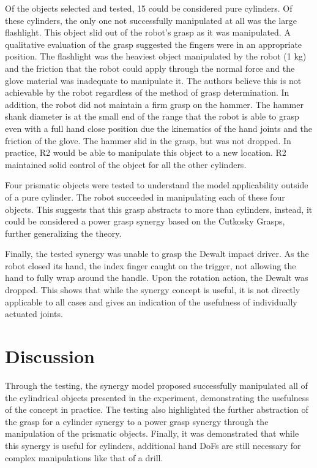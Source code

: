 \documentclass[runningheads,a4paper]{llncs}
\begin{document}
Of the objects selected and tested, 15 could be considered pure cylinders. Of these cylinders, the only one not successfully manipulated at all was the large flashlight. This object slid out of the robot's grasp as it was manipulated. A qualitative evaluation of the grasp suggested the fingers were in an appropriate position. The flashlight was the heaviest object manipulated by the robot (1 kg) and the friction that the robot could apply through the normal force and the glove material was inadequate to manipulate it. The authors believe this is not achievable by the robot regardless of the method of grasp determination. In addition, the robot did not maintain a firm grasp on the hammer. The hammer shank diameter is at the small end of the range that the robot is able to grasp even with a full hand close position due the kinematics of the hand joints and the friction of the glove. The hammer slid in the grasp, but was not dropped. In practice, R2 would be able to manipulate this object to a new location. R2 maintained solid control of the object for all the other cylinders. 

Four prismatic objects were tested to understand the model applicability outside of a pure cylinder. The robot succeeded in manipulating each of these four objects. This suggests that this grasp abstracts to more than cylinders, instead, it could be considered a power grasp synergy based on the Cutkosky Grasps, further generalizing the theory. 

Finally, the tested synergy was unable to grasp the Dewalt impact driver. As the robot closed its hand, the index finger caught on the trigger, not allowing the hand to fully wrap around the handle. Upon the rotation action, the Dewalt was dropped. This shows that while the synergy concept is useful, it is not directly applicable to all cases and gives an indication of the usefulness of individually actuated joints. 

\section{Discussion}
\label{discussion}

Through the testing, the synergy model proposed successfully manipulated all of the cylindrical objects presented in the experiment, demonstrating the usefulness of the concept in practice. The testing also highlighted the further abstraction of the grasp for a cylinder synergy to a power grasp synergy through the manipulation of the prismatic objects. Finally, it was demonstrated that while this synergy is useful for cylinders, additional hand DoFs are still necessary for complex manipulations like that of a drill.
\end{document}

